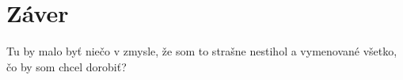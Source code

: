 \cleardoublepage
{}
{}
\chapter*{Záver}\label{chap:outro}
Tu by malo byť niečo v zmysle, že som to strašne nestihol a vymenované všetko, čo by som chcel dorobiť?

\backmatter

\cleardoublepage
{}
{}
% 
% 
% 
% 

\printbibliography
